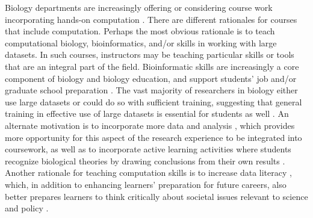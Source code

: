 Biology departments are increasingly offering or considering course work incorporating hands-on computation
\citep{WilsonSayres18}. 
There are different rationales for courses that include computation.
Perhaps the most obvious rationale is to teach computational biology, bioinformatics,
and/or skills in working with large datasets.
In such courses, instructors may be teaching particular skills or tools that are an integral part of the field.
Bioinformatic skills are increasingly a core component of biology and biology education, and 
support students' job and/or graduate school preparation \citep{WilsonSayres18}. 
The vast majority of researchers in biology either use large datasets or could do so with sufficient training, suggesting that general training in effective use of large datasets is essential for students as well \citep{Barone17,Loman13}.
An alternate motivation is to incorporate more data and analysis ,
which provides more opportunity for this aspect of the research experience to be
integrated into coursework, as well as to incorporate active learning activities where
students recognize biological theories by drawing conclusions from their own results
\citep{Kjelvik19}.
Another rationale for teaching computation skills is to increase data literacy \citep{Gibson18}, which, in addition to enhancing learners' preparation for future careers, also better prepares learners to think critically about societal issues relevant to science and policy \citep{cook2014}.

